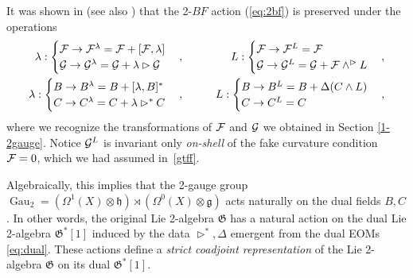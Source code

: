 \documentclass[onecolumn]{article}
\theoremstyle{theorem}
\theoremstyle{remark}
\theoremstyle{example}
\theoremstyle{definition}
\numberwithin{equation}{section}
\newcommand{\cF}{{\cal F}}
\newcommand{\cG}{{\cal G}}
\begin{document}
It was shown in  \cite{Martins:2010ry} (see also  \cite{Radenkovic:2019qme}) that the 2-$BF$ action  (\ref{eq:2bf}) is preserved under the operations
\begin{eqnarray}
 \lambda : \begin{cases}\cF\rightarrow \cF^\lambda = \cF + [\cF,\lambda] \\ \cG \rightarrow \cG^\lambda = \cG + \lambda\rhd \cG \end{cases}, &\qquad& 
 L: \begin{cases} \cF\rightarrow \cF^L= \cF  \\ 
  \cG\rightarrow \cG^L= \cG + \cF\wedge^\rhd L
 \end{cases}, \label{2BFgaugetrans}\\
    \lambda: \begin{cases}B\rightarrow B^\lambda = B + [\lambda,B]^* \\ C\rightarrow C^\lambda = C + \lambda\rhd^* C \end{cases},&\qquad& L: \begin{cases} B\rightarrow B^L= B + \Delta(C\wedge L) \\ C\rightarrow C^L= C\end{cases}, \label{2BFdualgaugetrans}
\end{eqnarray}
where we recognize the transformations of $\cF$ and $\cG$ we obtained in Section \ref{1-2gauge}. Notice $\cG^L$ is invariant only {\it {on-shell}} of the fake curvature condition $\cF =0$, which we had assumed in~\eqref{gtff}.

Algebraically, this implies that the 2-gauge group $\operatorname{Gau}_2= (\Omega^1(X)\otimes\mathfrak{h})\rtimes (\Omega^0(X)\otimes\mathfrak{g})$ acts naturally on the dual fields $B,C$. In other words, the original Lie 2-algebra $\mathfrak{G}$ has a natural action on the dual Lie 2-algebra $\mathfrak{G}^*[1]$ induced by the data $\rhd^*,\Delta$ emergent from the dual EOMs  \eqref{eq:dual}. These actions define a \textit{{strict coadjoint representation}} \cite{Bai_2013} of the Lie 2-algebra $\mathfrak{G}$ on its dual $\mathfrak{G}^*[1]$.
\end{document}
